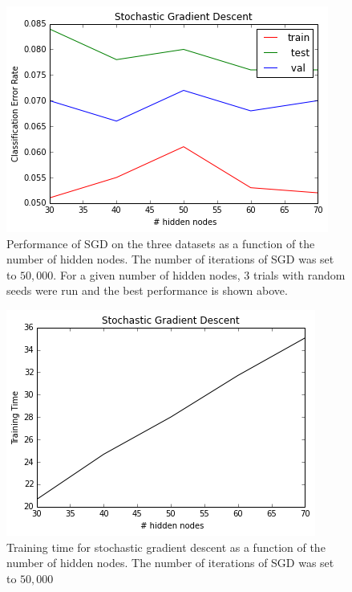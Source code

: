 \documentclass[10pt]{article}
\begin{document}
\begin{figure}
\centering
\includegraphics[scale=0.5]{SGD_mnist_CER_hidden_nodes.png}
\caption{Performance of SGD on the three datasets as a function of the number of hidden nodes. The number of iterations of SGD was set to $50,000$. For a given number of hidden nodes, 3 trials with random seeds were run and the best performance is shown above.}
\label{SGD_mnist_CER_hidden_nodes}
\end{figure}

\begin{figure}
\centering
\includegraphics[scale=0.5]{SGD_mnist_training_time_hidden_nodes.png}
\caption{Training time for stochastic gradient descent as a function of the number of hidden nodes. The number of iterations of SGD was set to $50,000$}
\label{SGD_mnist_training_time_hidden_nodes}
\end{figure}
\end{document}
